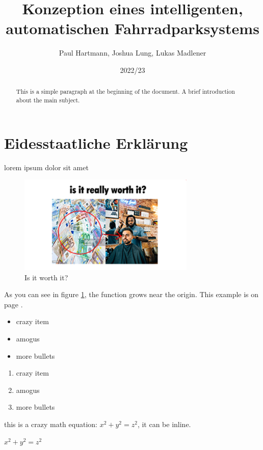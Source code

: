 \documentclass[a4paper]{article}
\title{Konzeption eines intelligenten, automatischen Fahrradparksystems}
\author{Paul Hartmann, Joshua Lung, Lukas Madlener}
\date{2022/23}
\begin{document}
\maketitle

\break

\section{Eidesstaatliche Erklärung}
lorem ipsum dolor sit amet


\begin{figure}[h]
  \centering
  \includegraphics[width=0.75\textwidth]{images/test}
  \caption{Is it worth it?}
  \label{fig:barber_cost}
\end{figure}

As you can see in figure \ref{fig:barber_cost}, the function grows near the origin. This example is on page \pageref{fig:barber_cost}.

\begin{itemize}
  \item crazy item
  \item amogus
  \item more bullets
\end{itemize}

\begin{enumerate}
  \item crazy item
  \item amogus
  \item more bullets
\end{enumerate}

this is a crazy math equation: $x^2 + y^2 = z^2$, it can be inline.

\begin{math}
  x^2 + y^2 = z^2
\end{math}


\begin{abstract}
  This is a simple paragraph at the beginning of the 
  document. A brief introduction about the main subject.
  \end{abstract}
\end{document}
